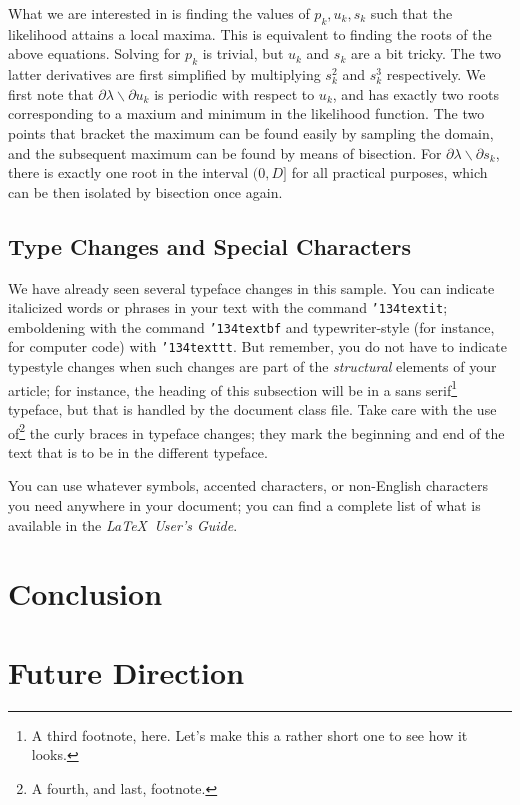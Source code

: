 \documentclass{acm_proc_article-sp}
\begin{document}
What we are interested in is finding the values of \textbf{$p_k, u_k, s_k$} such that the likelihood attains a local maxima. This is equivalent to finding the roots of the above equations. Solving for \(p_k\) is trivial, but \(u_k\) and \(s_k\) are a bit tricky.  The two latter derivatives are first simplified by multiplying \(s_k^2\) and \(s_k^3\) respectively. We first note that \(\partial \lambda \backslash \partial u_k \) is periodic with respect to \(u_k\), and has exactly two roots corresponding to a  maxium  and minimum in the likelihood function. The two points that bracket the maximum can be found easily by sampling the domain, and the subsequent maximum can be found by means of bisection. For \(\partial \lambda \backslash \partial s_k\), there is exactly one root in the interval \((0, D]\) for all practical purposes, which can be then isolated by bisection once again.

\subsection{Type Changes and {\subsecit Special} Characters}
We have already seen several typeface changes in this sample.  You
can indicate italicized words or phrases in your text with
the command \texttt{{\char'134}textit}; emboldening with the
command \texttt{{\char'134}textbf}
and typewriter-style (for instance, for computer code) with
\texttt{{\char'134}texttt}.  But remember, you do not
have to indicate typestyle changes when such changes are
part of the \textit{structural} elements of your
article; for instance, the heading of this subsection will
be in a sans serif\footnote{A third footnote, here.
Let's make this a rather short one to
see how it looks.} typeface, but that is handled by the
document class file. Take care with the use
of\footnote{A fourth, and last, footnote.}
the curly braces in typeface changes; they mark
the beginning and end of
the text that is to be in the different typeface.

You can use whatever symbols, accented characters, or
non-English characters you need anywhere in your document;
you can find a complete list of what is
available in the \textit{\LaTeX\
User's Guide}\cite{Lamport:LaTeX}.

\section{Conclusion}

\section{Future Direction}
\end{document}
